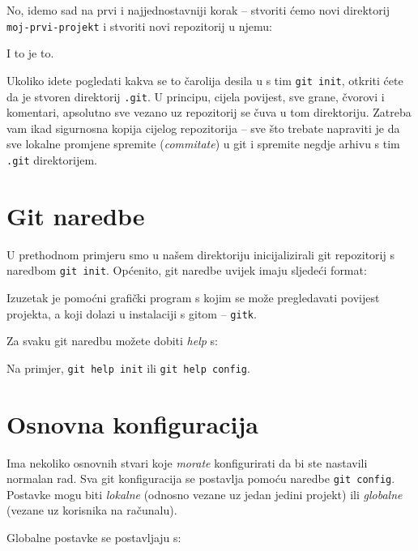 No, idemo sad na prvi i najjednostavniji korak -- stvoriti ćemo novi direktorij \verb+moj-prvi-projekt+ i stvoriti novi repozitorij u njemu:



I to je to. 

Ukoliko idete pogledati kakva se to čarolija desila u s tim \verb+git init+, otkriti ćete da je stvoren direktorij \verb+.git+.
U principu, cijela povijest, sve grane, čvorovi i komentari, apsolutno sve vezano uz repozitorij se čuva u tom direktoriju.
Zatreba vam ikad sigurnosna kopija cijelog repozitorija -- sve što trebate napraviti je da sve lokalne promjene spremite (\emph{commitate}) u git i spremite negdje arhivu s tim \verb+.git+ direktorijem.

\section*{Git naredbe}

U prethodnom primjeru smo u našem direktoriju inicijalizirali git repozitorij s naredbom \verb+git init+.
Općenito, git naredbe uvijek imaju sljedeći format:

\gitoutput{
\color{blue}{git $<$komanda$>$ $<$opcija1$>$ $<$opcija2$>$ \dots}
}

Izuzetak je pomoćni grafički program s kojim se može pregledavati povijest projekta, a koji dolazi u instalaciji s gitom -- \verb+gitk+.

Za svaku git naredbu možete dobiti \emph{help} s:


Na primjer, \verb+git help init+ ili \verb+git help config+.

\section*{Osnovna konfiguracija}

Ima nekoliko osnovnih stvari koje \emph{morate} konfigurirati da bi ste nastavili normalan rad. 
Sva git konfiguracija se postavlja pomoću naredbe \verb+git config+. 
Postavke mogu biti \emph{lokalne} (odnosno vezane uz jedan jedini projekt) ili \emph{globalne} (vezane uz korisnika na računalu).

Globalne postavke se postavljaju s:


